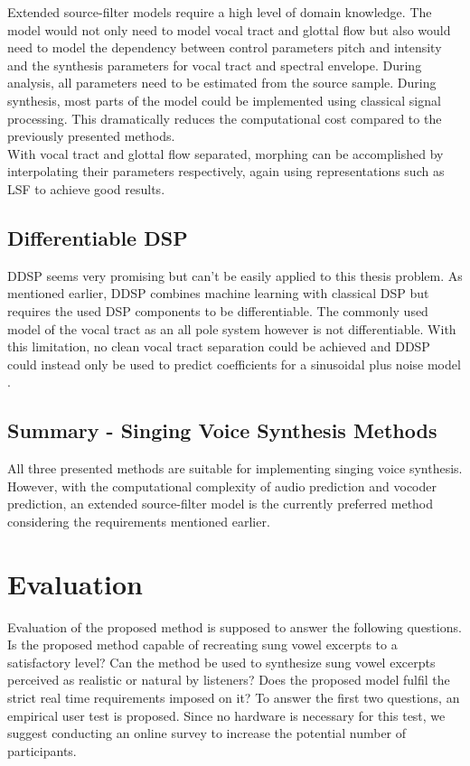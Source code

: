 Extended source-filter models require a high level of domain knowledge. The model would not only need to model vocal tract and glottal flow but also would need to model the dependency between control parameters pitch and intensity and the synthesis parameters for vocal tract and spectral envelope. During analysis, all parameters need to be estimated from the source sample. During synthesis, most parts of the model could be implemented using classical signal processing. This dramatically reduces the computational cost compared to the previously presented methods.\\
With vocal tract and glottal flow separated, morphing can be accomplished by interpolating their parameters respectively, again using representations such as LSF to achieve good results.

\subsection*{Differentiable DSP}

DDSP \cite{engel_ddsp:_2020} seems very promising but can't be easily applied to this thesis problem. As mentioned earlier, DDSP combines machine learning with classical DSP but requires the used DSP components to be differentiable. The commonly used model of the vocal tract as an all pole system however is not differentiable. With this limitation, no clean vocal tract separation could be achieved and DDSP could instead only be used to predict coefficients for a sinusoidal plus noise model \cite{serra_musical_1997}.

\subsection*{Summary - Singing Voice Synthesis Methods}

All three presented methods are suitable for implementing singing voice synthesis. However, with the computational complexity of audio prediction and vocoder prediction, an extended source-filter model is the currently preferred method considering the requirements mentioned earlier.\\

\section{Evaluation}

Evaluation of the proposed method is supposed to answer the following questions. Is the proposed method capable of recreating sung vowel excerpts to a satisfactory level? Can the method be used to synthesize sung vowel excerpts perceived as realistic or natural by listeners? Does the proposed model fulfil the strict real time requirements imposed on it? To answer the first two questions, an empirical user test is proposed. Since no hardware is necessary for this test, we suggest conducting an online survey to increase the potential number of participants. 

